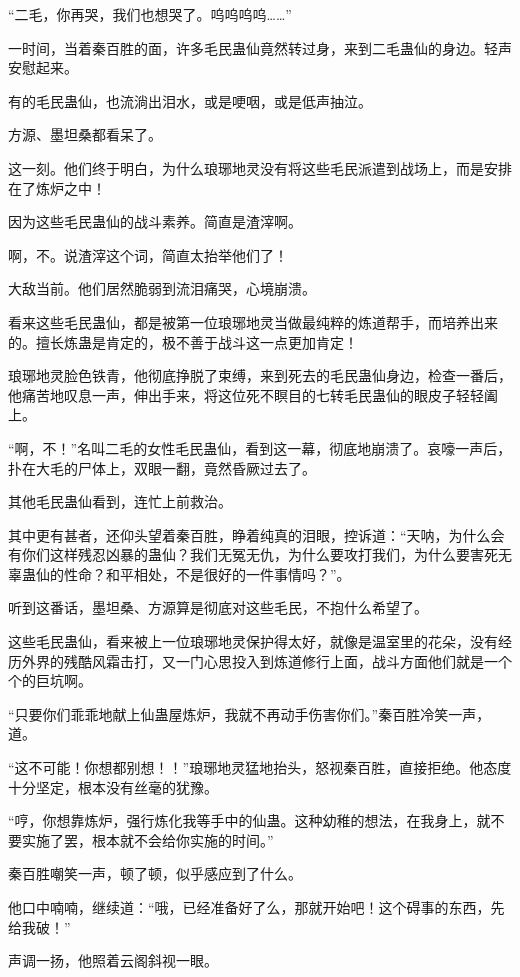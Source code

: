 \begin{this_body}
“二毛，你再哭，我们也想哭了。呜呜呜呜……”

一时间，当着秦百胜的面，许多毛民蛊仙竟然转过身，来到二毛蛊仙的身边。轻声安慰起来。

有的毛民蛊仙，也流淌出泪水，或是哽咽，或是低声抽泣。

方源、墨坦桑都看呆了。

这一刻。他们终于明白，为什么琅琊地灵没有将这些毛民派遣到战场上，而是安排在了炼炉之中！

因为这些毛民蛊仙的战斗素养。简直是渣滓啊。

啊，不。说渣滓这个词，简直太抬举他们了！

大敌当前。他们居然脆弱到流泪痛哭，心境崩溃。

看来这些毛民蛊仙，都是被第一位琅琊地灵当做最纯粹的炼道帮手，而培养出来的。擅长炼蛊是肯定的，极不善于战斗这一点更加肯定！

琅琊地灵脸色铁青，他彻底挣脱了束缚，来到死去的毛民蛊仙身边，检查一番后，他痛苦地叹息一声，伸出手来，将这位死不瞑目的七转毛民蛊仙的眼皮子轻轻阖上。

“啊，不！”名叫二毛的女性毛民蛊仙，看到这一幕，彻底地崩溃了。哀嚎一声后，扑在大毛的尸体上，双眼一翻，竟然昏厥过去了。

其他毛民蛊仙看到，连忙上前救治。

其中更有甚者，还仰头望着秦百胜，睁着纯真的泪眼，控诉道：“天呐，为什么会有你们这样残忍凶暴的蛊仙？我们无冤无仇，为什么要攻打我们，为什么要害死无辜蛊仙的性命？和平相处，不是很好的一件事情吗？”。

听到这番话，墨坦桑、方源算是彻底对这些毛民，不抱什么希望了。

这些毛民蛊仙，看来被上一位琅琊地灵保护得太好，就像是温室里的花朵，没有经历外界的残酷风霜击打，又一门心思投入到炼道修行上面，战斗方面他们就是一个个的巨坑啊。

“只要你们乖乖地献上仙蛊屋炼炉，我就不再动手伤害你们。”秦百胜冷笑一声，道。

“这不可能！你想都别想！！”琅琊地灵猛地抬头，怒视秦百胜，直接拒绝。他态度十分坚定，根本没有丝毫的犹豫。

“哼，你想靠炼炉，强行炼化我等手中的仙蛊。这种幼稚的想法，在我身上，就不要实施了罢，根本就不会给你实施的时间。”

秦百胜嘲笑一声，顿了顿，似乎感应到了什么。

他口中喃喃，继续道：“哦，已经准备好了么，那就开始吧！这个碍事的东西，先给我破！”

声调一扬，他照着云阁斜视一眼。


\end{this_body}
